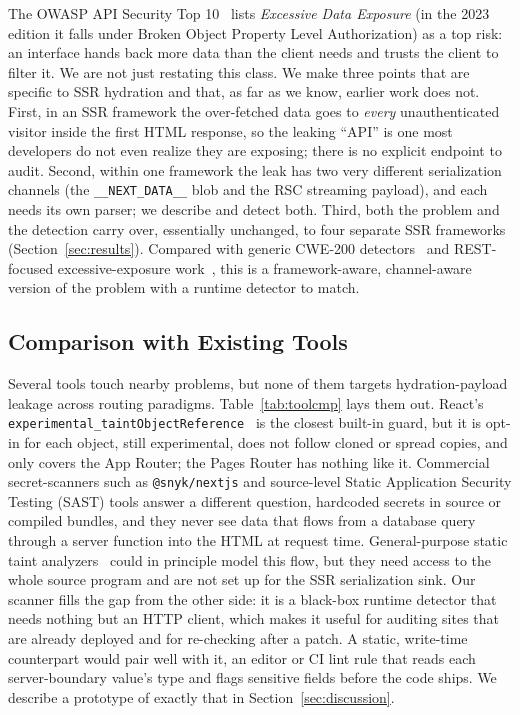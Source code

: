 \documentclass[runningheads]{llncs}
\begin{document}
The OWASP API Security Top 10~\cite{owasp_api2023} lists
\emph{Excessive Data Exposure} (in the 2023 edition it falls under Broken
Object Property Level Authorization) as a top risk: an interface hands
back more data than the client needs and trusts the client to filter it.
We are not just restating this class.  We make three points that are
specific to SSR hydration and that, as far as we know, earlier work does
not.  First, in an SSR framework the over-fetched data goes to
\emph{every} unauthenticated visitor inside the first HTML response, so
the leaking ``API'' is one most developers do not even realize they are
exposing; there is no explicit endpoint to audit.  Second, within one
framework the leak has two very different serialization channels (the
\texttt{\_\_NEXT\_DATA\_\_} blob and the RSC streaming payload), and each
needs its own parser; we describe and detect both.  Third, both the
problem and the detection carry over, essentially unchanged, to four
separate SSR frameworks (Section~\ref{sec:results}).  Compared with
generic CWE-200 detectors~\cite{siexvults2025} and REST-focused
excessive-exposure work~\cite{genfer2022}, this is a framework-aware,
channel-aware version of the problem with a runtime detector to match.

\subsection{Comparison with Existing Tools}
\label{sec:toolcmp}

Several tools touch nearby problems, but none of them targets
hydration-payload leakage across routing paradigms.  Table~\ref{tab:toolcmp}
lays them out.  React's
\texttt{experimental\_taintObjectReference}~\cite{react_taint} is the
closest built-in guard, but it is opt-in for each object, still
experimental, does not follow cloned or spread copies, and only covers the
App Router; the Pages Router has nothing like it.  Commercial
secret-scanners such as \texttt{@snyk/nextjs} and source-level Static
Application Security Testing (SAST) tools answer a different question,
hardcoded secrets in source or compiled bundles, and they never see data
that flows from a database query through a server function into the HTML
at request time.  General-purpose static taint
analyzers~\cite{siexvults2025,lekies2013} could in principle model this
flow, but they need access to the whole source program and are not set up
for the SSR serialization sink.  Our scanner fills the gap from the other
side: it is a black-box runtime detector that needs nothing but an HTTP
client, which makes it useful for auditing sites that are already deployed
and for re-checking after a patch.  A static, write-time counterpart would
pair well with it, an editor or CI lint rule that reads each
server-boundary value's type and flags sensitive fields before the code
ships.  We describe a prototype of exactly that in
Section~\ref{sec:discussion}.
\end{document}
